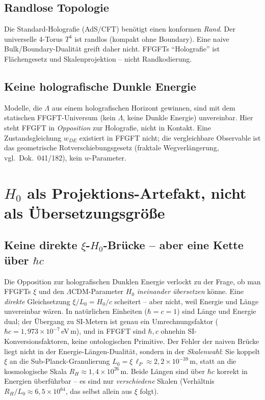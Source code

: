\subsection*{Randlose Topologie}

Die Standard-Holografie (AdS/CFT) benötigt einen konformen \emph{Rand}. Der
universelle 4-Torus $T^4$ ist randlos (kompakt ohne Boundary). Eine naive
Bulk/Boundary-Dualität greift daher nicht. FFGFTs \enquote{Holografie} ist
Flächengesetz und Skalenprojektion -- nicht Randkodierung.

\subsection*{Keine holografische Dunkle Energie}

Modelle, die $\Lambda$ aus einem holografischen Horizont gewinnen, sind mit
dem statischen FFGFT-Universum (kein $\Lambda$, keine Dunkle Energie)
unvereinbar. Hier steht FFGFT in \emph{Opposition} zur Holografie, nicht in
Kontakt. Eine Zustandsgleichung $w_{DE}$ existiert in FFGFT nicht; die
vergleichbare Observable ist das geometrische Rotverschiebungsgesetz
(fraktale Wegverlängerung, vgl.\ Dok.~041/182), kein
$w$-Parameter.

\section{\texorpdfstring{$H_0$ als Projektions-Artefakt, nicht als Übersetzungsgröße}{H0 als Projektions-Artefakt, nicht als Uebersetzungsgroesse}}

\subsection*{Keine direkte \texorpdfstring{$\xi$}{xi}-\texorpdfstring{$H_0$}{H0}-Brücke -- aber eine Kette über \texorpdfstring{$\hbar c$}{hbar c}}

Die Opposition zur holografischen Dunklen Energie verlockt zu der Frage, ob
man FFGFTs $\xi$ und den $\Lambda$CDM-Parameter $H_0$ \emph{ineinander
übersetzen} könne. Eine \emph{direkte} Gleichsetzung $\xi/L_0 = H_0/c$
scheitert -- aber nicht, weil Energie und Länge unvereinbar wären. In
natürlichen Einheiten ($\hbar = c = 1$) sind Länge und Energie dual; der
Übergang zu SI-Metern ist genau ein Umrechnungsfaktor ($\hbar c =
1{,}973\times10^{-7}$\,eV\,m), und in FFGFT sind $\hbar, c$ ohnehin
SI-Konversionsfaktoren, keine ontologischen Primitive. Der Fehler der naiven
Brücke liegt nicht in der Energie-Längen-Dualität, sondern in der
\emph{Skalenwahl}: Sie koppelt $\xi$ an die Sub-Planck-Granulierung
$L_0 = \xi\,\ell_P \approx 2{,}2\times10^{-39}$\,m, statt an die kosmologische
Skala $R_H \approx 1{,}4\times10^{26}$\,m. Beide Längen sind über $\hbar c$
korrekt in Energien überführbar -- es sind nur \emph{verschiedene} Skalen
(Verhältnis $R_H/L_0 \approx 6{,}5\times10^{64}$, das selbst allein aus $\xi$
folgt).

